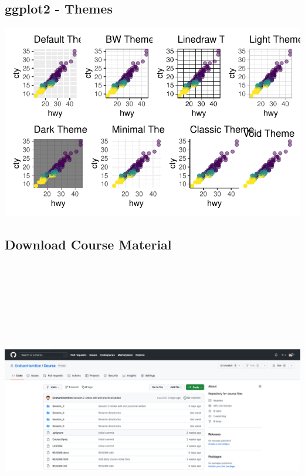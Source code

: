 \documentclass[
  letterpaper,
  DIV=11,
  numbers=noendperiod,
  landscape]{scrartcl}
\begin{document}
\hypertarget{ggplot2---themes}{%
\subsection{ggplot2 - Themes}\label{ggplot2---themes}}

\includegraphics{RandRStudio_files/figure-pdf/unnamed-chunk-11-1.pdf}

\hypertarget{download-course-material}{%
\subsection{Download Course Material}\label{download-course-material}}

\includegraphics[width=\textwidth,height=5.20833in]{images/Github.png}
\end{document}
